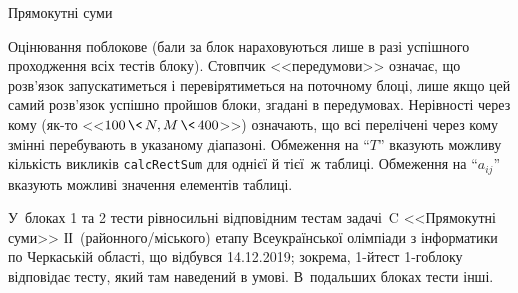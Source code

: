 \begin{problemAllDefault}{Прямокутні суми}
% 

\Scoring
Оцінювання поблокове (бали за блок нараховуються лише в разі успішного проходження всіх тестів блоку).
Стовпчик <<передумови>> означає, що розв'язок запускатиметься і перевірятиметься на поточному блоці, лише якщо цей самий розв'язок успішно пройшов блоки, згадані в передумовах.
Нерівності через кому (\mbox{як-то} <<${100\,{\<}\,N,M\,{\<}\,400}$>>) означають, що всі перелічені через кому змінні перебувають в указаному діапазоні. 
Обмеження на ``$T$'' вказують можливу кількість викликів \texttt{calcRectSum} для однієї й тієї~ж таблиці.
Обмеження на ``$a_{ij}$'' вказують можливі значення елементів таблиці.

У~блоках 1 та 2 тести рівносильні відповідним тестам задачі~C <<Прямокутні суми>> ІІ~(районного/\nolinebreak[3]місь\-кого) етапу Всеукраїнської олімпіади з інформатики по Черкаській області, що відбувся 14.12.2019; зокрема, \mbox{1-й}\nolinebreak[3] тест \mbox{1-го}\nolinebreak[3] блоку відповідає тесту, який там наведений в умові.
В~подальших блоках тести інші.

\end{problemAllDefault}
